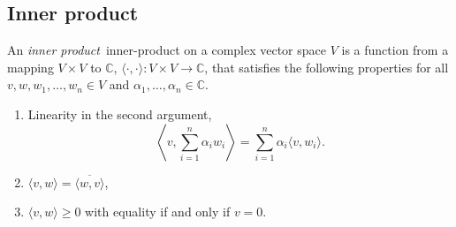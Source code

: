 \subsection{Inner product}



\begin{definition} \label{def:inner_product}
An \emph{inner product}~\gls{inner-product} on a complex vector space $V$ is a function from a mapping $V\times V$ to $\mathbb{C}$, $\langle \cdot, \cdot \rangle : V \times V \rightarrow \mathbb{C}$,  that satisfies the following properties for all $v, w, w_1, \ldots, w_n \in V$ and $\alpha_1, \ldots, \alpha_n \in \mathbb{C}.$

\begin{enumerate}
  \item Linearity in the second argument,$$ \left\langle v, \sum_{i=1}^n \alpha_i w_i\right\rangle = \sum_{i=1}^n \alpha_i \langle v, w_i\rangle. $$
  \item $\langle v,w \rangle = \overline{\langle w,v \rangle} $, 
  \item  $\langle v,w \rangle \geq 0 $ with equality if and only if $v = 0$.
\end{enumerate}
\end{definition}

